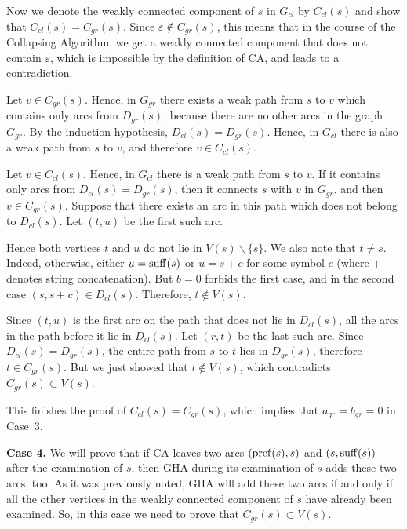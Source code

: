 Now we denote the weakly connected component of $ s $ in $ G_{cl} $ by $ C_{cl} (s) $ and show that $ C_{cl} (s) = C_{gr} (s) $. Since $ \varepsilon \notin C_{gr} (s) $, this means that in the course of the Collapsing Algorithm, we get a weakly connected component that does not contain $ \varepsilon $, which is impossible by the definition of CA, and leads to a contradiction.

Let $ v \in C_{gr} (s) $. Hence, in $ G_{gr} $ there exists a weak path from $ s $ to $ v $ which contains only arcs from $ D_{gr} (s) $, because there are no other arcs in the graph $G_{gr}$. By the induction hypothesis, $ D_{cl} (s) = D_{gr} (s) $. Hence, in $ G_{cl} $ there is also a weak path from $ s $ to $ v $, and therefore $ v \in C_{cl} (s) $.

Let $ v \in C_{cl} (s) $. Hence, in $ G_{cl} $ there is a weak path from $ s $ to $ v $. If it contains only arcs from $ D_{cl} (s) = D_{gr} (s) $, then it connects $ s $ with $ v $ in $ G_{gr} $, and then $ v \in C_{gr} (s) $. Suppose that there exists an arc in this path which does not belong to $ D_{cl} (s) $. Let $(t, u)$ be the first such arc.

Hence both vertices $ t $ and $ u $ do not lie in $ V (s) \backslash \{s \} $. We also note that $ t \ne s $. Indeed, otherwise, either $ u = \operatorname{suff} (s) $ or $ u = s + c $ for some symbol $ c $ (where $+$ denotes string concatenation). But $ b = 0 $ forbids the first case, and in the second case $ (s, s + c) \in D_{cl} (s) $. Therefore, $ t \notin V (s) $.

Since $ (t, u) $ is the first arc on the path that does not lie in $ D_{cl} (s) $, all the arcs in the path before it lie in $ D_{cl} (s) $. Let $ (r, t) $ be the last such arc. Since $ D_{cl} (s) = D_{gr} (s) $, the entire path from $ s $ to $ t $ lies in $ D_{gr} (s) $, therefore $ t \in C_{gr} (s) $. But we just showed that $ t \notin V (s) $, which contradicts $ C_{gr} (s) \subset V (s) $.

This finishes the proof of $ C_{cl} (s) = C_{gr} (s) $, which implies that $a_{gr}=b_{gr}=0$ in Case~3.

\textbf {Case 4.} We will prove that if CA leaves two arcs $ (\operatorname{pref} (s), s) $ and $ (s, \operatorname{suff} (s)) $ after the examination of $ s $, then GHA during its examination of $ s $ adds these two arcs, too. As it was previously noted, GHA will add these two arcs if and only if all the other vertices in the weakly connected component of $ s $ have already been examined. So, in this case we need to prove that $ C_{gr} (s) \subset V (s) $.

